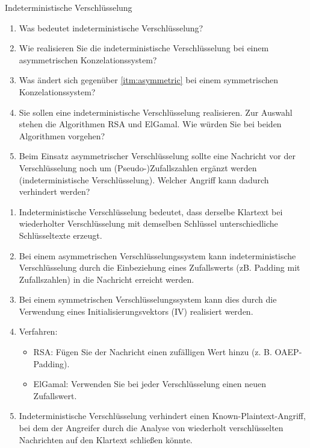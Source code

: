 \documentclass{article}
\begin{document}
\setcounter{subsection}{104}
\begin{exercise}{Indeterministische Verschlüsselung}\label{ex:indeterministic}
  \begin{enumerate}
    \item Was bedeutet indeterministische Verschlüsselung?
    \item\label{itm:asymmetric} Wie realisieren Sie die indeterministische Verschlüsselung bei einem asymmetrischen Konzelationssystem?
    \item Was ändert sich gegenüber \ref{itm:asymmetric} bei einem symmetrischen Konzelationssystem?
    \item Sie sollen eine indeterministische Verschlüsselung realisieren. Zur Auswahl stehen die Algorithmen RSA und ElGamal. Wie würden Sie bei beiden Algorithmen vorgehen?
    \item Beim Einsatz asymmetrischer Verschlüsselung sollte eine Nachricht vor der Verschlüsselung noch um (Pseudo-)Zufallszahlen ergänzt werden (indeterministische Verschlüsselung). Welcher Angriff kann dadurch verhindert werden?
  \end{enumerate}

  \begin{solution}
    \begin{enumerate}
        \item Indeterministische Verschlüsselung bedeutet, dass derselbe Klartext bei wiederholter Verschlüsselung mit demselben Schlüssel unterschiedliche Schlüsseltexte erzeugt.
        \item Bei einem asymmetrischen Verschlüsselungssystem kann indeterministische Verschlüsselung durch die Einbeziehung eines Zufallswerts (zB. Padding mit Zufallszahlen) in die Nachricht erreicht werden.
        \item Bei einem symmetrischen Verschlüsselungssystem kann dies durch die Verwendung eines Initialisierungsvektors (IV) realisiert werden.
        \item Verfahren:
        \begin{itemize}
            \item RSA: Fügen Sie der Nachricht einen zufälligen Wert hinzu (z. B. OAEP-Padding).
            \item ElGamal: Verwenden Sie bei jeder Verschlüsselung einen neuen Zufallswert.
        \end{itemize}
        \item Indeterministische Verschlüsselung verhindert einen Known-Plaintext-Angriff, bei dem der Angreifer durch die Analyse von wiederholt verschlüsselten Nachrichten auf den Klartext schließen könnte.
    \end{enumerate}
  \end{solution}
\end{exercise}
\end{document}
